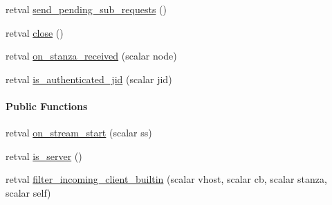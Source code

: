 \begin{Indent}
\begin{DoxyCompactItemize}
\item 
retval \hyperlink{class_d_jabberd_1_1_connection_1_1_client_in_a652aa56958c844ac242a2fff06afba4c}{send\-\_\-pending\-\_\-sub\-\_\-requests} ()
\item 
retval \hyperlink{class_d_jabberd_1_1_connection_1_1_client_in_af34e4d1557ea1071210432a2e4ef3871}{close} ()
\item 
retval \hyperlink{class_d_jabberd_1_1_connection_1_1_client_in_a0458c9ae427b63840d6220f178631bc8}{on\-\_\-stanza\-\_\-received} (scalar node)
\item 
retval \hyperlink{class_d_jabberd_1_1_connection_1_1_client_in_a3fa136ae07367f66c3166bbf33a5abfa}{is\-\_\-authenticated\-\_\-jid} (scalar jid)
\end{DoxyCompactItemize}
\end{Indent}
\begin{Indent}\paragraph*{\-Public \-Functions}
\begin{DoxyCompactItemize}
\item 
retval \hyperlink{class_d_jabberd_1_1_connection_1_1_client_in_a9a53b1e335fa929e6c505c1364e06723}{on\-\_\-stream\-\_\-start} (scalar ss)
\item 
retval \hyperlink{class_d_jabberd_1_1_connection_1_1_client_in_aa7d0aa5420e8596a8a68589a4d5160cd}{is\-\_\-server} ()
\item 
retval \hyperlink{class_d_jabberd_1_1_connection_1_1_client_in_ab737661635a6acf8b31760876c973861}{filter\-\_\-incoming\-\_\-client\-\_\-builtin} (scalar vhost, scalar cb, scalar stanza, scalar self)
\end{DoxyCompactItemize}
\end{Indent}


